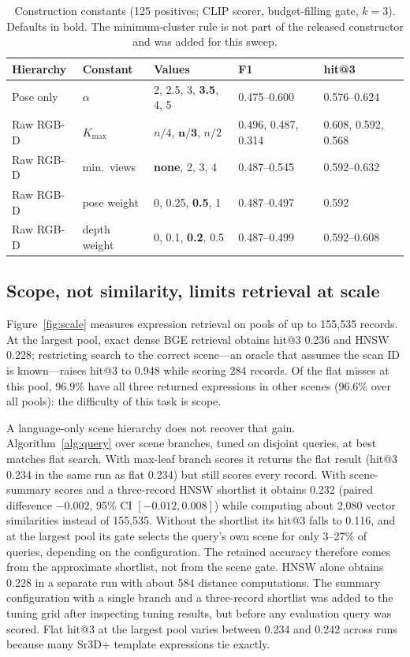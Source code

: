 \documentclass{ieeeaccess}
\begin{document}
\begin{table}[!t]
\centering
\caption{Construction constants (125 positives; CLIP scorer, budget-filling gate,
$k=3$). Defaults in bold. The minimum-cluster rule is not part of the released
constructor and was added for this sweep.}
\label{tab:constants}
\footnotesize
\begin{tabular}{lllll}
\toprule
Hierarchy & Constant & Values & F1 & hit@3 \\
\midrule
Pose only & $\alpha$ & 2, 2.5, 3, \textbf{3.5}, 4, 5 & 0.475--0.600 & 0.576--0.624 \\
Raw RGB-D & $K_{\max}$ & $n/4$, $\boldsymbol{n/3}$, $n/2$ & 0.496, 0.487, 0.314 & 0.608, 0.592, 0.568 \\
Raw RGB-D & min.\ views & \textbf{none}, 2, 3, 4 & 0.487--0.545 & 0.592--0.632 \\
Raw RGB-D & pose weight & 0, 0.25, \textbf{0.5}, 1 & 0.487--0.497 & 0.592 \\
Raw RGB-D & depth weight & 0, 0.1, \textbf{0.2}, 0.5 & 0.487--0.499 & 0.592--0.608 \\
\bottomrule
\end{tabular}
\end{table}

\subsection{Scope, not similarity, limits retrieval at scale}
\label{sec:scale}
Figure~\ref{fig:scale} measures expression retrieval on pools of up to 155,535
records. At the largest pool, exact dense BGE retrieval obtains hit@3 0.236 and
HNSW~\cite{hnsw2020} 0.228; restricting search to the correct scene---an oracle
that assumes the scan ID is known---raises hit@3 to 0.948 while scoring 284
records. Of the flat misses at this pool, 96.9\% have all three returned
expressions in other scenes (96.6\% over all pools): the difficulty of this task is scope.

A language-only scene hierarchy does not recover that gain.
Algorithm~\ref{alg:query} over scene branches, tuned on disjoint queries, at best
matches flat search. With max-leaf branch scores it returns the flat result
(hit@3 0.234 in the same run as flat 0.234) but still scores every record. With
scene-summary scores and a three-record HNSW shortlist it obtains 0.232 (paired
difference $-0.002$, 95\% CI $[-0.012,0.008]$) while computing about 2,080 vector
similarities instead of 155,535. Without the shortlist its hit@3 falls to 0.116,
and at the largest pool its gate selects the query's own scene for only
3--27\% of queries, depending on the configuration. The retained accuracy therefore comes from the approximate shortlist, not from
the scene gate. HNSW alone obtains 0.228 in a separate run with about 584
distance computations. The summary configuration with a single branch and a
three-record shortlist was added to the tuning grid after inspecting tuning
results, but before any evaluation query was scored. Flat
hit@3 at the largest pool varies between 0.234 and 0.242 across runs because many
Sr3D+ template expressions tie exactly.
\end{document}
